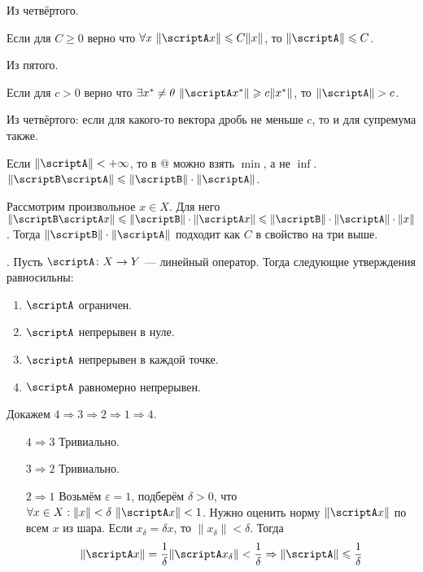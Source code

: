 \documentclass{article}
\makeatletter
\newcommand*{\romanic}[1]{\expandafter\@slowromancap\romannumeral #1@}
\makeatother
\begin{document}
\begin{itemize}
\begin{Proof}
            Из четвёртого.
        \end{Proof}
        \thm Если для $C\geqslant0$ верно что $\forall x~\|\scriptA x\|\leqslant C\|x\|$, то $\|\scriptA\|\leqslant C$.
        \begin{Proof}
            Из пятого.
        \end{Proof}
        \thm Если для $c>0$ верно что $\exists x^*\neq\theta~\|\scriptA x^*\|\geqslant c\|x^*\|$, то $\|\scriptA\|>c$.
        \begin{Proof}
            Из четвёртого: если для какого-то вектора дробь не меньше $c$, то и для супремума также.
        \end{Proof}
        \thm Если $\|\scriptA\|<+\infty$, то в \romanic{5} можно взять $\min$, а не $\inf$.
        \thm $\|\scriptB\scriptA\|\leqslant\|\scriptB\|\cdot\|\scriptA\|$.
        \begin{Proof}
            Рассмотрим произвольное $x\in X$. Для него $\|\scriptB\scriptA x\|\leqslant\|\scriptB\|\cdot\|\scriptA x\|\leqslant\|\scriptB\|\cdot\|\scriptA\|\cdot\|x\|$. Тогда $\|\scriptB\|\cdot\|\scriptA\|$ подходит как $C$ в свойство на три выше.
        \end{Proof}
        \thm {}. Пусть $\scriptA\colon X\to Y$ --- линейный оператор. Тогда следующие утверждения равносильны:
        \begin{enumerate}
            \item $\scriptA$ ограничен.
            \item $\scriptA$ непрерывен в нуле.
            \item $\scriptA$ непрерывен в каждой точке.
            \item $\scriptA$ равномерно непрерывен.
        \end{enumerate}
        \begin{Proof}
            Докажем $4\Rightarrow3\Rightarrow2\Rightarrow1\Rightarrow4$.
            \begin{itemize}
                \item[$4\Rightarrow3$] Тривиально.
                \item[$3\Rightarrow2$] Тривиально.
                \item[$2\Rightarrow1$] Возьмём $\varepsilon=1$, подберём $\delta>0$, что $\forall x\in X:\|x\|<\delta~\|\scriptA x\|<1$. Нужно оценить норму $\|\scriptA x\|$ по всем $x$ из шара. Если $x_\delta=\delta x$, то $\|x_\delta\|<\delta$. Тогда
                $$
                \|\scriptA x\|=\frac1\delta\|\scriptA x_\delta\|<\frac1\delta\Rightarrow\|\scriptA\|\leqslant\frac1\delta
$$
\end{itemize}
\end{Proof}
\end{itemize}
\end{document}
